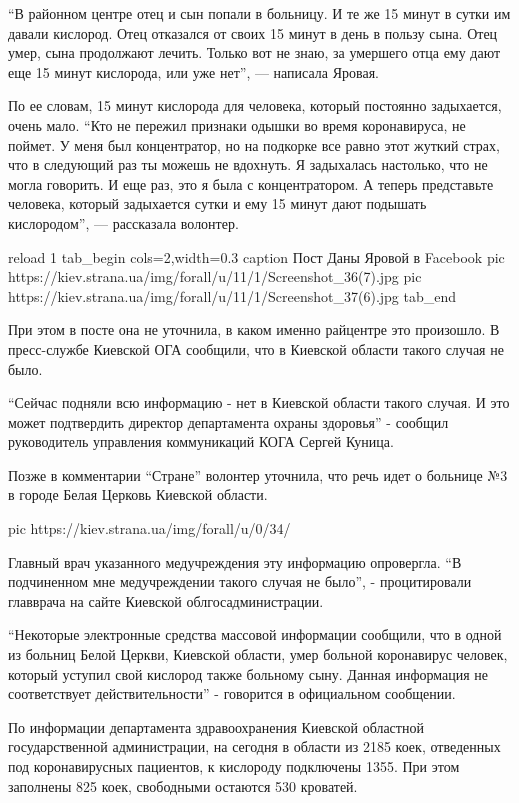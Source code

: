 \enquote{В районном центре отец и сын попали в больницу. И те же 15 минут в сутки
им давали кислород. Отец отказался от своих 15 минут в день в пользу сына.
Отец умер, сына продолжают лечить. Только вот не знаю, за умершего отца
ему дают еще 15 минут кислорода, или уже нет}, — написала Яровая.

По ее словам, 15 минут кислорода для человека, который постоянно
задыхается, очень мало. \enquote{Кто не пережил признаки одышки во время
коронавируса, не поймет. У меня был концентратор, но на подкорке все равно
этот жуткий страх, что в следующий раз ты можешь не вдохнуть. Я задыхалась
настолько, что не могла говорить. И еще раз, это я была с концентратором.
А теперь представьте человека, который задыхается сутки и ему 15 минут
дают подышать кислородом}, — рассказала волонтер.

\ifcmt
reload 1
tab_begin cols=2,width=0.3
  caption Пост Даны Яровой в Facebook
  pic https://kiev.strana.ua/img/forall/u/11/1/Screenshot_36(7).jpg
  pic https://kiev.strana.ua/img/forall/u/11/1/Screenshot_37(6).jpg
tab_end
\fi

При этом в посте она не уточнила, в каком именно райцентре это произошло.
В пресс-службе Киевской ОГА сообщили, что в Киевской области такого случая
не было.

\enquote{Сейчас подняли всю информацию - нет в Киевской области такого случая. И
это может подтвердить директор департамента охраны здоровья} - сообщил
руководитель управления коммуникаций КОГА Сергей Куница.

Позже в комментарии \enquote{Стране} волонтер уточнила, что речь идет о больнице
№3 в городе Белая Церковь Киевской области.

\ifcmt
pic https://kiev.strana.ua/img/forall/u/0/34/%
\fi

Главный врач указанного медучреждения эту информацию опровергла. \enquote{В
подчиненном мне медучреждении такого случая не было}, -  процитировали
главврача на сайте Киевской облгосадминистрации.

\enquote{Некоторые электронные средства массовой информации сообщили, что в одной
из больниц Белой Церкви, Киевской области, умер больной коронавирус
человек, который уступил свой кислород также больному сыну. Данная
информация не соответствует действительности} - говорится в официальном
сообщении.

По информации департамента здравоохранения Киевской областной
государственной администрации, на сегодня в области из 2185 коек,
отведенных под коронавирусных пациентов, к кислороду подключены 1355. При
этом заполнены 825 коек, свободными остаются 530 кроватей.

